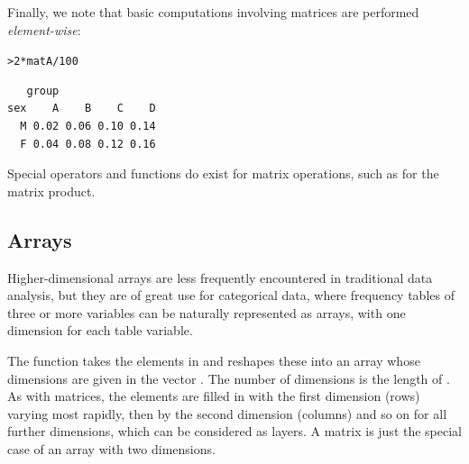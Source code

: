 \documentclass[10pt,krantz2]{krantz}\usepackage[]{graphicx}\usepackage[]{color}
\makeatletter
\newcommand{\hlnum}[1]{\textcolor[rgb]{0.686,0.059,0.569}{#1}}%
\newcommand{\hlopt}[1]{\textcolor[rgb]{0,0,0}{#1}}%
\newcommand{\hlstd}[1]{\textcolor[rgb]{0.345,0.345,0.345}{#1}}%
\newenvironment{kframe}{%
 \def\at@end@of@kframe{}%
 \ifinner\ifhmode%
  \def\at@end@of@kframe{\end{minipage}}%
  \begin{minipage}{\columnwidth}%
 \fi\fi%
 \def\FrameCommand##1{\hskip\@totalleftmargin \hskip-\fboxsep
 \colorbox{shadecolor}{##1}\hskip-\fboxsep
     \hskip-\linewidth \hskip-\@totalleftmargin \hskip\columnwidth}%
 \MakeFramed {\advance\hsize-\width
   \@totalleftmargin\z@ \linewidth\hsize
   \@setminipage}}%
 {\par\unskip\endMakeFramed%
 \at@end@of@kframe}
\newenvironment{knitrout}{}{} %
\renewenvironment{knitrout}{\small\renewcommand{\baselinestretch}{.85}}{} %
\makeatother
\begin{document}
\noindent Finally, we note that basic computations involving matrices
are performed \emph{element-wise}:

\begin{knitrout}
\color{fgcolor}\begin{kframe}
\begin{alltt}
\hlstd{> }\hlnum{2} \hlopt{*} \hlstd{matA} \hlopt{/} \hlnum{100}
\end{alltt}
\begin{verbatim}
   group
sex    A    B    C    D
  M 0.02 0.06 0.10 0.14
  F 0.04 0.08 0.12 0.16
\end{verbatim}
\end{kframe}
\end{knitrout}

\noindent Special operators and functions do exist for matrix
operations, such as \code{\%*\%} for the matrix product. %

\subsection{Arrays}
Higher-dimensional arrays are less frequently encountered in traditional data analysis,
but they are of great use for categorical data, where frequency tables of three or more
variables can be naturally represented as arrays, with one dimension for each
table variable.

The function  takes the elements in  and
reshapes these into an array whose dimensions are given in the vector .
The number of dimensions is the length of .  As with matrices, the
elements are filled in with the first dimension (rows) varying most rapidly,
then by the second dimension (columns) and so on for all further dimensions,
which can be considered as layers.
A matrix is just the special case of an array with two dimensions.
\end{document}
